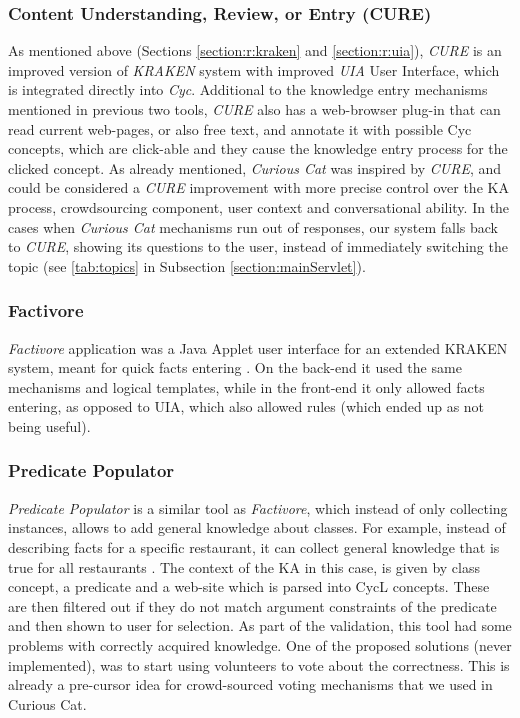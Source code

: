 \subsubsection{Content Understanding, Review, or Entry (CURE)}
\label{section:r:cure}
As mentioned above (Sections \ref{section:r:kraken} and \ref{section:r:uia}),
\emph{CURE}\parencite{Witbrock2010} is an improved version of \emph{KRAKEN} 
system with improved
\emph{UIA} User Interface, which is integrated directly into \emph{Cyc}. 
Additional to the knowledge entry mechanisms mentioned in previous two tools,
\emph{CURE} also has a web-browser plug-in that can read current web-pages,
or also free text, and annotate it with possible Cyc concepts, which are
click-able and they cause the knowledge entry process for the clicked concept.
As already mentioned, \emph{Curious Cat} was inspired by \emph{CURE}, and
could be considered a \emph{CURE} improvement with more precise control over the
KA process, crowdsourcing component, user context and conversational ability.
In the cases when \emph{Curious Cat} mechanisms run out of responses,
our system falls back to \emph{CURE}, showing its questions to the user, instead
of immediately switching the topic (see \autoref{tab:topics} in 
Subsection \ref{section:mainServlet}).

\subsubsection{Factivore}
\label{section:r:factivore} 
\emph{Factivore} application was a Java Applet user interface for an extended
KRAKEN system,
meant for quick facts entering \parencite{Witbrock2005}. On the back-end it used
the same mechanisms and logical templates, while in the front-end it only
allowed facts entering, as opposed to UIA, which also allowed rules (which
ended up as not being useful).

\subsubsection{Predicate Populator}
\label{section:r:pp}
\emph{Predicate Populator} is a similar tool as \emph{Factivore}, which instead
of only collecting instances, allows to add general knowledge about classes. For
example, instead of describing facts for a specific restaurant, it can collect
general knowledge that is true for all restaurants \parencite{Witbrock2005}. The
context of the KA in this case, is given by class concept, a predicate and a 
web-site which is parsed into CycL concepts. These are then filtered out if they
do not match argument constraints of the predicate and then shown to user for 
selection. As part of the validation, this tool had some problems with correctly
acquired knowledge. One of the proposed solutions (never implemented), was to
start using volunteers to vote about the correctness. This is already a 
pre-cursor idea for crowd-sourced voting mechanisms that we used in Curious Cat.

